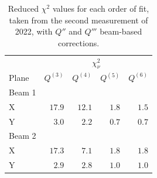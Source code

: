 \begin{table}[H]
    \centering
    \begin{tabular}{lrrrr}
     \toprule
                  & \multicolumn{4}{c}{$\chi^2_\nu$} \\
        Plane     &   $Q^{(3)}$ &  $Q^{(4)}$ &   $Q^{(5)}$ &   $Q^{(6)}$  \\
      \midrule
        Beam 1    &   &   &   & \\
        \hspace{2mm}X         & $17.9$  & $12.1$ & $1.8$ & $1.5$ \\         %
        \hspace{2mm}Y         & $ 3.0$  & $2.2 $ & $0.7$ & $0.7 $\\          %
        Beam 2    &    &    &   &\\
        \hspace{2mm}X         & $17.3$ & $7.1$ & $1.8$ & $1.8$ \\           %
        \hspace{2mm}Y         & $2.9 $ & $2.8$ & $1.0$ & $1.0$ \\            %
      \bottomrule
    \end{tabular}
    \caption{Reduced $\chi^2$ values for each order of fit, taken from the second
    measurement of 2022, with $Q''$ and $Q'''$ beam-based corrections.}
    \label{tab:high_orders:chisquare_quality}
  \end{table}

